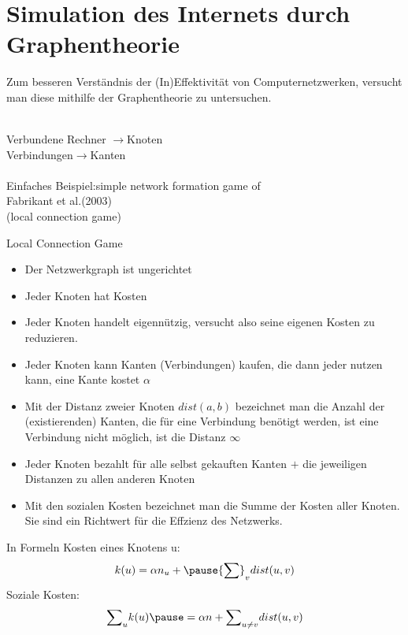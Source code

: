 \documentclass[mathserif, aspectratio=169]{beamer}
\begin{document}
\section{Simulation des Internets durch Graphentheorie}
\begin{frame}
Zum besseren Verst\"andnis der (In)Effektivit\"at von Computernetzwerken, versucht man diese mithilfe der Graphentheorie zu untersuchen.
\begin{tabbing}
\hspace{5cm}\=\\
\pause
Verbundene Rechner \>$\longrightarrow$Knoten\\
Verbindungen\>$\longrightarrow$Kanten\\\\
\pause
Einfaches Beispiel:\>simple network formation game of\\\> Fabrikant et al.(2003) \\\>(local connection game)
\end{tabbing}
\end{frame}
\begin{frame}
\begin{block}
{Local Connection Game}
\begin{itemize}
\pause
        \item Der Netzwerkgraph ist ungerichtet
\pause
        \item Jeder Knoten hat Kosten
\pause
        \item Jeder Knoten handelt eigenn\"utzig, versucht also seine eigenen Kosten zu reduzieren.
\pause
        \item Jeder Knoten kann Kanten (Verbindungen) kaufen, die dann jeder nutzen kann, eine Kante kostet $\alpha$
\pause
        \item Mit der Distanz zweier Knoten $dist(a,b)$ bezeichnet man die Anzahl der (existierenden) Kanten, die f\"ur eine Verbindung ben\"otigt werden, ist eine Verbindung nicht m\"oglich, ist die Distanz $\infty$
\pause
        \item Jeder Knoten bezahlt f\"ur alle selbst gekauften Kanten $+$ die jeweiligen Distanzen zu allen anderen Knoten
\pause
        \item Mit den sozialen Kosten bezeichnet man die Summe der Kosten aller Knoten. Sie sind ein Richtwert f\"ur die Effzienz des Netzwerks.
\end{itemize}
\end{block}
\end{frame}

\begin{frame}
\begin{block}
{In Formeln}
\pause
Kosten eines Knotens u:
\pause
\[k(u)=\alpha n_u + \pause {\sum}_v dist(u,v)\]
\pause
Soziale Kosten:
\[{\sum}_u k(u)\pause= \alpha n + {\sum}_{u\not=v} dist (u,v)\]
\end{block}
\end{frame}
\end{document}
